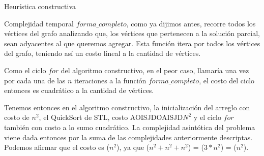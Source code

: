 \begin{section}{Heurística constructiva}
\begin{subsection}{Complejidad temporal}
			$forma\_completo$, como ya dijimos antes, recorre todos los vértices del grafo analizando que, los vértices que pertenecen a la solución parcial, sean adyacentes al que queremos agregar. Esta función itera por todos los vértices del grafo, teniendo así un costo lineal a la cantidad de vértices.
			
			Como el ciclo $for$ del algoritmo constructivo, en el peor caso, llamaría una vez por cada una de las $n$ iteraciones a la función $forma\_completo$, el costo del ciclo entonces es cuadrático a la cantidad de vértices.
			
			Tenemos entonces en el algoritmo constructivo, la inicialización del arreglo con costo de $n^2$, el QuickSort de STL, costo AOISJDOAISJD$N^2$ y el ciclo $for$ también con costo a lo sumo cuadrático. La complejidad asintótica del problema viene dada entonces por la suma de las complejidades anteriormente descriptas. Podemos afirmar que el costo es \Ode($n^2$), ya que \Ode($n^2 + n^2 + n^2$) = \Ode($3*n^2$) = \Ode($n^2$).
			
		\end{subsection}

\end{section}

